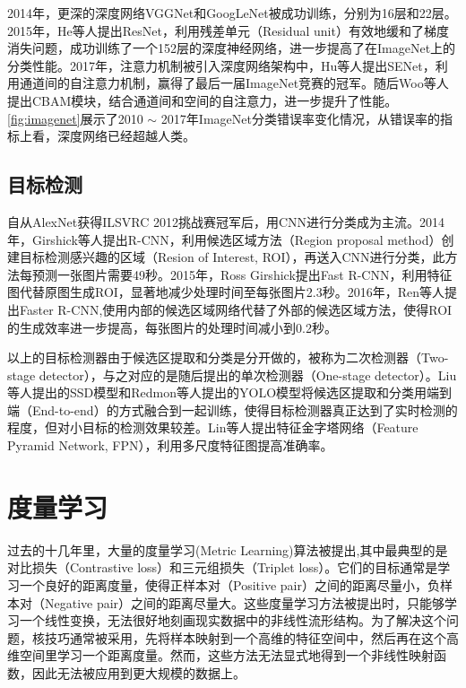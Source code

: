 2014年，更深的深度网络VGGNet\cite{simonyan2014very}和GoogLeNet\cite{szegedy2015going}被成功训练，分别为16层和22层。2015年，He等人提出ResNet\cite{he2016deep}，利用残差单元（Residual unit）有效地缓和了梯度消失问题，成功训练了一个152层的深度神经网络，进一步提高了在ImageNet上的分类性能。2017年，注意力机制被引入深度网络架构中，Hu等人提出SENet\cite{hu2018squeeze}，利用通道间的自注意力机制，赢得了最后一届ImageNet竞赛的冠军。随后Woo等人提出CBAM模块\cite{woo2018cbam}，结合通道间和空间的自注意力，进一步提升了性能。\autoref{fig:imagenet}展示了2010 $\sim$ 2017年ImageNet分类错误率变化情况，从错误率的指标上看，深度网络已经超越人类。

\subsection{目标检测}

自从AlexNet获得ILSVRC 2012挑战赛冠军后，用CNN进行分类成为主流。2014年，Girshick等人提出R-CNN\cite{girshick2014rich}，利用候选区域方法（Region proposal method）创建目标检测感兴趣的区域（Resion of Interest, ROI），再送入CNN进行分类，此方法每预测一张图片需要49秒。2015年，Ross Girshick提出Fast R-CNN\cite{girshick2015fast}，利用特征图代替原图生成ROI，显著地减少处理时间至每张图片2.3秒。2016年，Ren等人提出Faster R-CNN\cite{ren2015faster},使用内部的候选区域网络代替了外部的候选区域方法，使得ROI的生成效率进一步提高，每张图片的处理时间减小到0.2秒。

以上的目标检测器由于候选区提取和分类是分开做的，被称为二次检测器（Two-stage detector），与之对应的是随后提出的单次检测器（One-stage detector）。Liu等人提出的SSD模型\cite{liu2016ssd}和Redmon等人提出的YOLO模型\cite{redmon2016you, redmon2017yolo9000, redmon2018yolov3}将候选区提取和分类用端到端（End-to-end）的方式融合到一起训练，使得目标检测器真正达到了实时检测的程度，但对小目标的检测效果较差。Lin等人提出特征金字塔网络（Feature Pyramid Network, FPN）\cite{lin2017feature}，利用多尺度特征图提高准确率。

\section{度量学习}

过去的十几年里，大量的度量学习(Metric Learning)算法被提出,其中最典型的是对比损失（Contrastive loss）\cite{chopra2005learning, hadsell2006dimensionality}和三元组损失（Triplet loss）\cite{weinberger2009distance, chechik2010large}。它们的目标通常是学习一个良好的距离度量，使得正样本对（Positive pair）之间的距离尽量小，负样本对（Negative pair）之间的距离尽量大。这些度量学习方法被提出时，只能够学习一个线性变换，无法很好地刻画现实数据中的非线性流形结构。为了解决这个问题，核技巧通常被采用，先将样本映射到一个高维的特征空间中，然后再在这个高维空间里学习一个距离度量\cite{tsang2003distance, yeung2007kernel}。然而，这些方法无法显式地得到一个非线性映射函数，因此无法被应用到更大规模的数据上。

